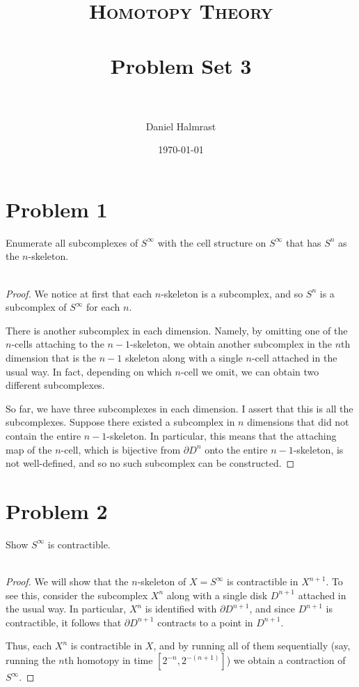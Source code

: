 \documentclass[fontsize=11pt]{scrartcl} %
\title{	
\normalfont \normalsize 
\textsc{Homotopy Theory} \\ [25pt] %
\horrule{0.5pt} \\[0.4cm] %
\huge Problem Set 3 \\ %
\horrule{2pt} \\[0.5cm] %
}
\author{Daniel Halmrast} %
\date{\normalsize\today} %
\numberwithin{equation}{section} %
\numberwithin{figure}{section} %
\numberwithin{table}{section} %
\begin{document}
\maketitle %

\section*{Problem 1} %
Enumerate all subcomplexes of $S^{\infty}$ with the cell structure on
$S^{\infty}$ that has $S^n$ as the $n$-skeleton.
\\
\\
\begin{proof}
    We notice at first that each $n$-skeleton is a subcomplex, and so $S^n$ is a
    subcomplex of $S^{\infty}$ for each $n$.

    There is another subcomplex in each dimension. Namely, by omitting one of
    the $n$-cells attaching to the $n-1$-skeleton, we obtain another subcomplex
    in the $n$th dimension that is the $n-1$ skeleton along with a single
    $n$-cell attached in the usual way. In fact, depending on which $n$-cell we
    omit, we can obtain two different subcomplexes.

    So far, we have three subcomplexes in each dimension. I assert that this is
    all the subcomplexes. Suppose there existed a subcomplex in $n$ dimensions
    that did not contain the entire $n-1$-skeleton. In particular, this means
    that the attaching map of the $n$-cell, which is bijective from $\partial
    D^n$ onto the entire
    $n-1$-skeleton, is not well-defined, and so no such subcomplex can be
    constructed.
\end{proof}


\section*{Problem 2} %
Show $S^{\infty}$ is contractible.
\\
\\
\begin{proof}
    We will show that the $n$-skeleton of $X=S^{\infty}$ is contractible in
    $X^{n+1}$. To see this, consider the subcomplex $X^n$ along with a single
    disk $D^{n+1}$ attached in the usual way. In particular, $X^n$ is identified
    with $\partial D^{n+1}$, and since $D^{n+1}$ is contractible, it follows
    that $\partial D^{n+1}$ contracts to a point in
    $D^{n+1}$.

    Thus, each $X^n$ is contractible in $X$, and by running all of them
    sequentially (say, running the $n$th homotopy in time $[2^{-n},2^{-(n+1)}]$)
    we obtain a contraction of $S^{\infty}$.
\end{proof}
\end{document}
